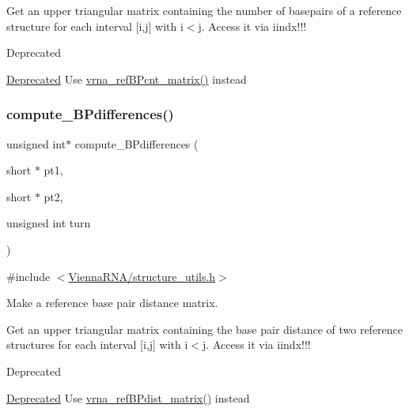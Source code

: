 Get an upper triangular matrix containing the number of basepairs of a reference structure for each interval \mbox{[}i,j\mbox{]} with i$<$j. Access it via iindx!!!

\begin{DoxyRefDesc}{Deprecated}
\item[\hyperlink{deprecated__deprecated000144}{Deprecated}]Use \hyperlink{group__struct__utils_gab4c2a00c99ce1d612ffa5bde114eb96d}{vrna\+\_\+ref\+B\+Pcnt\+\_\+matrix()} instead \end{DoxyRefDesc}
\mbox{\label{group__struct__utils_gadd463184355d0803b6ee6e09f29182f2}} 
\subsubsection{\texorpdfstring{compute\+\_\+\+B\+Pdifferences()}{compute\_BPdifferences()}}
{\footnotesize\ttfamily unsigned int$\ast$ compute\+\_\+\+B\+Pdifferences (\begin{DoxyParamCaption}\item[{short $\ast$}]{pt1,  }\item[{short $\ast$}]{pt2,  }\item[{unsigned int}]{turn }\end{DoxyParamCaption})}



{\ttfamily \#include $<$\hyperlink{structure__utils_8h}{Vienna\+R\+N\+A/structure\+\_\+utils.\+h}$>$}



Make a reference base pair distance matrix. 

Get an upper triangular matrix containing the base pair distance of two reference structures for each interval \mbox{[}i,j\mbox{]} with i$<$j. Access it via iindx!!!

\begin{DoxyRefDesc}{Deprecated}
\item[\hyperlink{deprecated__deprecated000145}{Deprecated}]Use \hyperlink{group__struct__utils_ga5a27bd058183170afd4716f5b8ff511a}{vrna\+\_\+ref\+B\+Pdist\+\_\+matrix()} instead \end{DoxyRefDesc}
\mbox{\label{group__struct__utils_gadf0ad2d46c9ca7b850437d1b79627a7e}} 
